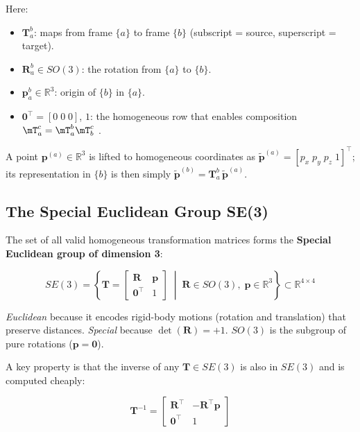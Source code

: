 Here:

\begin{itemize}
  \item $\mathbf{T}_{a}^{b}$: maps from frame $\{a\}$ to frame $\{b\}$
        (subscript = source, superscript = target).
  \item $\mathbf{R}_{a}^{b}\in SO(3)$: the rotation from $\{a\}$ to
        $\{b\}$.
  \item $\mathbf{p}_{a}^{b}\in\mathbb{R}^3$: origin of $\{b\}$ in $\{a\}$.
  \item $\mathbf{0}^\top=[0\;0\;0]$, $1$: the homogeneous row that
        enables composition $\mT_a^c=\mT_a^b\mT_b^c$
        \cite{Hartley2003}.
\end{itemize}

A point $\mathbf{p}^{(a)}\in\mathbb{R}^3$ is lifted to homogeneous
coordinates as $\tilde{\mathbf{p}}^{(a)}=[p_x\;p_y\;p_z\;1]^\top$;
its representation in $\{b\}$ is then simply
$\tilde{\mathbf{p}}^{(b)}=\mathbf{T}_a^b\,\tilde{\mathbf{p}}^{(a)}$.

\subsection{The Special Euclidean Group SE(3)}
\label{subsec:SE3}

The set of all valid homogeneous transformation matrices forms the
\textbf{Special Euclidean group of dimension 3}:

\begin{equation}
\label{eq:SE3_def}
SE(3) = \left\{
\mathbf{T} =
\begin{bmatrix}
\mathbf{R} & \mathbf{p} \\
\mathbf{0}^\top & 1
\end{bmatrix}
\;\middle|\;
\mathbf{R}\in SO(3),\;\mathbf{p}\in\mathbb{R}^3
\right\}
\subset \mathbb{R}^{4\times4}
\end{equation}

\emph{Euclidean} because it encodes rigid-body motions (rotation and
translation) that preserve distances.
\emph{Special} because $\det(\mathbf{R})=+1$.
$SO(3)$ is the subgroup of pure rotations ($\mathbf{p}=\mathbf{0}$).

A key property is that the inverse of any $\mathbf{T}\in SE(3)$ is
also in $SE(3)$ and is computed cheaply:

\begin{equation}
\label{eq:SE3_inv}
\mathbf{T}^{-1} =
\begin{bmatrix}
\mathbf{R}^\top & -\mathbf{R}^\top\mathbf{p} \\
\mathbf{0}^\top & 1
\end{bmatrix}
\end{equation}

